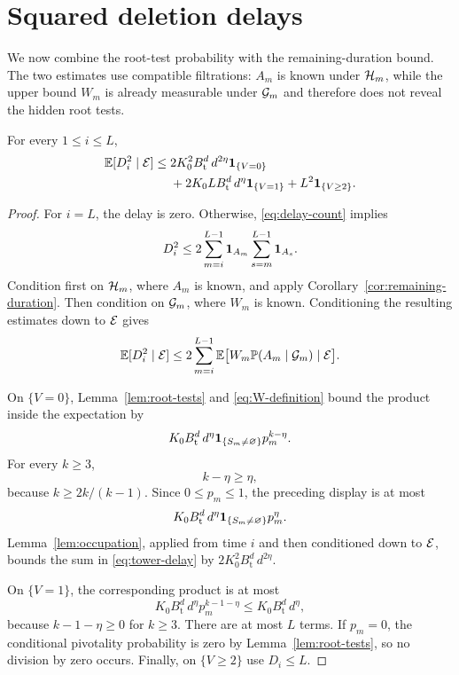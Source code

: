 \section{Squared deletion delays}
\label{sec:delay}

We now combine the root-test probability with the remaining-duration bound.
The two estimates use compatible filtrations: $A_m$ is known under
$\mathcal H_m$, while the upper bound $W_m$ is already measurable under
$\mathcal G_m$ and therefore does not reveal the hidden root tests.

\begin{proposition}
\label{prop:conditional-delay}
For every $1\le i\le L$,
\begin{align}
    \mathbb E[D_i^2\mid\mathcal E]
    \le{}&
    2K_0^2B_{\mathrm{t}}^d\,d^{2\eta}\mathbf 1_{\{V=0\}}
    \notag\\
    &+2K_0LB_{\mathrm{t}}^d\,d^\eta\mathbf 1_{\{V=1\}}
    +L^2\mathbf 1_{\{V\ge2\}}.
    \label{eq:conditional-delay-bound}
\end{align}
\end{proposition}

\begin{proof}
For $i=L$, the delay is zero.  Otherwise,
\eqref{eq:delay-count} implies
\[
    D_i^2
    \le
    2\sum_{m=i}^{L-1}\mathbf 1_{A_m}
       \sum_{s=m}^{L-1}\mathbf 1_{A_s}.
\]
Condition first on $\mathcal H_m$, where $A_m$ is known, and apply
Corollary~\ref{cor:remaining-duration}.  Then condition on $\mathcal G_m$, where
$W_m$ is known.  Conditioning the resulting estimates down to $\mathcal E$ gives
\begin{equation}
    \mathbb E[D_i^2\mid\mathcal E]
    \le
    2\sum_{m=i}^{L-1}
      \mathbb E\bigl[
        W_m\mathbb P(A_m\mid\mathcal G_m)
        \mid\mathcal E
      \bigr].
    \label{eq:tower-delay}
\end{equation}

On $\{V=0\}$, Lemma~\ref{lem:root-tests} and
\eqref{eq:W-definition} bound the product inside the expectation by
\[
    K_0B_{\mathrm{t}}^d\,d^\eta
    \mathbf 1_{\{S_m\ne\varnothing\}}p_m^{k-\eta}.
\]
For every $k\ge3$,
\begin{equation}
    k-\eta\ge\eta,
    \label{eq:critical-exponent}
\end{equation}
because $k\ge2k/(k-1)$.  Since $0\le p_m\le1$, the preceding display is at
most
\[
    K_0B_{\mathrm{t}}^d\,d^\eta
    \mathbf 1_{\{S_m\ne\varnothing\}}p_m^\eta.
\]
Lemma~\ref{lem:occupation}, applied from time $i$ and then conditioned down
to $\mathcal E$, bounds the sum in \eqref{eq:tower-delay} by
$2K_0^2B_{\mathrm{t}}^d\,d^{2\eta}$.

On $\{V=1\}$, the corresponding product is at most
\[
    K_0B_{\mathrm{t}}^d\,d^\eta p_m^{k-1-\eta}
    \le K_0B_{\mathrm{t}}^d\,d^\eta,
\]
because $k-1-\eta\ge0$ for $k\ge3$.  There are at most $L$ terms.  If
$p_m=0$, the conditional pivotality probability is zero by
Lemma~\ref{lem:root-tests}, so no division by zero occurs.  Finally, on
$\{V\ge2\}$ use $D_i\le L$.
\end{proof}

